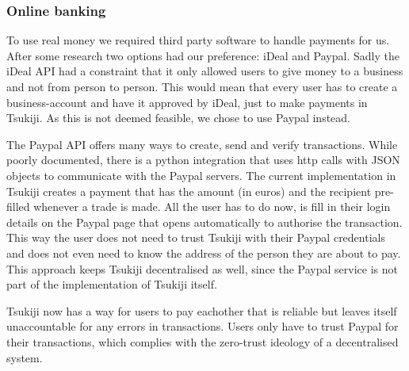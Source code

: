 \subsubsection{Online banking}
To use real money we required third party software to handle payments for us. 
After some research two options had our preference: iDeal and Paypal.
Sadly the iDeal API had a constraint that it only allowed users to give money to a business and not from person to person.
This would mean that every user has to create a business-account and have it approved by iDeal, just to make payments in Tsukiji.
As this is not deemed feasible, we chose to use Paypal instead.

The Paypal API offers many ways to create, send and verify transactions.
While poorly documented, there is a python integration that uses http calls with JSON objects to communicate with the Paypal servers.
The current implementation in Tsukiji creates a payment that has the amount (in euros) and the recipient pre-filled whenever a trade is made.
All the user has to do now, is fill in their login details on the Paypal page that opens automatically to authorise the transaction.
This way the user does not need to trust Tsukiji with their Paypal credentials and does not even need to know the address of the person they are about to pay.
This approach keeps Tsukiji decentralised as well, since the Paypal service is not part of the implementation of Tsukiji itself.

Tsukiji now has a way for users to pay eachother that is reliable but leaves itself unaccountable for any errors in transactions.
Users only have to trust Paypal for their transactions, which complies with the zero-trust ideology of a decentralised system.
